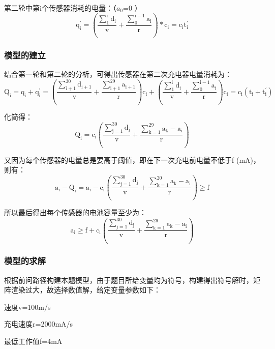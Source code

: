 \documentclass{article}
\begin{document}
第二轮中第i个传感器消耗的电量：（$a_0$=0 ）
\begin{equation}
    \mathrm{q_{i}^{\prime}=\left(\frac{\sum_{1}^{i} d_{i}}{v}+\frac{\sum_{0}^{i-1} a_{i}}{r}\right) * c_{i}=c_{i} t_{i}^{\prime}}
    \tag{19}
\end{equation}

\subsubsection{模型的建立}
结合第一轮和第二轮的分析，可得出传感器在第二次充电器电量消耗为：
\begin{equation}
    \mathrm{Q_{i}=q_{i}+q_{i}^{\prime}=\left(\frac{\sum_{i+1}^{30} d_{i+1}}{v}+\frac{\sum_{i+1}^{29} a_{i+1}}{r}\right) c_{i}+\left(\frac{\sum_{1}^{i} d_{i}}{v}+\frac{\sum_{0}^{i-1} a_{i}}{r}\right) c_{i}=c_{i}\left(t_{i}+t_{i}^{\prime}\right)}
    \tag{20}
\end{equation}

化简得：
\begin{equation}
    \mathrm{Q_{i}=c_{i}\left(\frac{\sum_{j=1}^{30} d_{j}}{v}+\frac{\sum_{k=1}^{29} a_{k}-a_{i}}{r}\right)}
    \tag{21}
\end{equation}

又因为每个传感器的电量总是要高于阈值，即在下一次充电前电量不低于f (mA)，则有：
\begin{equation}
    \mathrm{a_{i}-Q_{i}=a_{i}-c_{i}\left(\frac{\sum_{j=1}^{30} d_{j}}{v}+\frac{\sum_{k=1}^{20} a_{k}-a_{i}}{r}\right) \geqslant f}
    \tag{22}
\end{equation}

所以最后得出每个传感器的电池容量至少为：
\begin{equation}
    \mathrm{a_{i} \geqslant f+c_{i}\left(\frac{\sum_{j=1}^{30} d_{j}}{v}+\frac{\sum_{k=1}^{29} a_{k}-a_{i}}{r}\right)}
    \tag{23}
\end{equation}

\subsubsection{模型的求解}
根据前问路径构建本题模型，由于题目所给变量均为符号，构建得出符号解时，矩阵渲染过大，故选择数值解，给定变量参数如下：

速度v=100m/s

充电速度r=2000mA/s

最低工作值f=4mA
\end{document}

